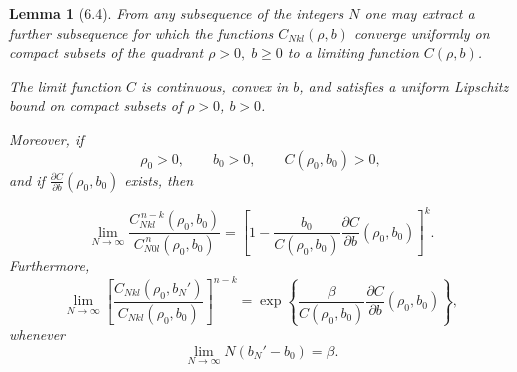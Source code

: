 \documentclass[11pt]{article}
\newtheorem{lemma}{Lemma}
\begin{document}
\begin{lemma}[6.4]\label{lemmaClimit}
    From any subsequence of the integers $N$ one may extract a further subsequence for which the functions $C_{N kl}(\rho,b)$ converge uniformly on compact subsets of the quadrant $\rho>0, \;b\ge0$ to a \emph{limiting function} $C(\rho,b)$.

The limit function $C$ is continuous, convex in $b$, and satisfies
a uniform Lipschitz bound on compact subsets of $\rho>0$, $b>0$.

Moreover, if
\[
\rho_0>0, \qquad b_0>0,
\qquad C(\rho_0,b_0)>0,
\]
and if $\frac{\partial C}{\partial b}(\rho_0,b_0)$ exists, then

\begin{equation}
\lim_{N\to\infty}
\frac{C^{\,n-k}_{N kl}(\rho_0,b_0)}
{C^{\,n}_{N0l}(\rho_0,b_0)}
=
\left[
1-\frac{b_0}{C(\rho_0,b_0)}\frac{\partial C}{\partial b}(\rho_0,b_0)
\right]^k .
\tag{6.22}\label{6.22}
\end{equation}
Furthermore,
\begin{equation}
\lim_{N\to\infty}
\left[
\frac{C_{N kl}(\rho_0,b_N')}
{C_{N kl}(\rho_0,b_0)}
\right]^{n-k}
=
\exp\!\left\{
\frac{\beta}{C(\rho_0,b_0)} \frac{\partial C}{\partial b}(\rho_0,b_0)
\right\},
\tag{6.23}\label{6.23}
\end{equation}
whenever
\[
\lim_{N\rightarrow\infty} N(b_N'-b_0)=\beta .
\]
\end{lemma}
\end{document}
